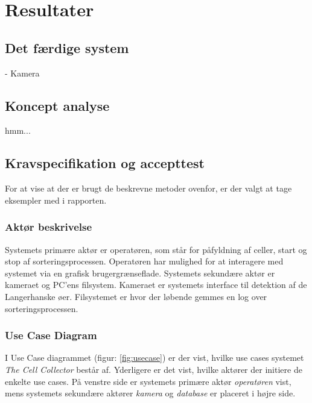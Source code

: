 \chapter{Resultater}

\section{Det færdige system}
- Kamera


\section{Koncept analyse}
hmm...
 
\section{Kravspecifikation og accepttest}
\label{subsec:krav}
For at vise at der er brugt de beskrevne metoder ovenfor, er der valgt at tage eksempler med i rapporten. %

\subsection{Aktør beskrivelse}
Systemets primære aktør er operatøren, som står for påfyldning af celler, start og stop af sorteringsprocessen. Operatøren har mulighed for at interagere med systemet via en grafisk brugergrænseflade. Systemets sekundære aktør er kameraet og PC’ens filsystem. Kameraet er systemets interface til detektion af de Langerhanske øer. Filsystemet er hvor der løbende gemmes en log over sorteringsprocessen.

\subsection{Use Case Diagram}
I Use Case diagrammet (figur: \ref{fig:usecase}) er der vist, hvilke use cases systemet \textit{The Cell Collector} består af. Yderligere er det vist, hvilke aktører der initiere de enkelte use cases. På venstre side er systemets primære aktør \textit{operatøren} vist, mens systemets sekundære aktører \textit{kamera} og \textit{database} er placeret i højre side. 

